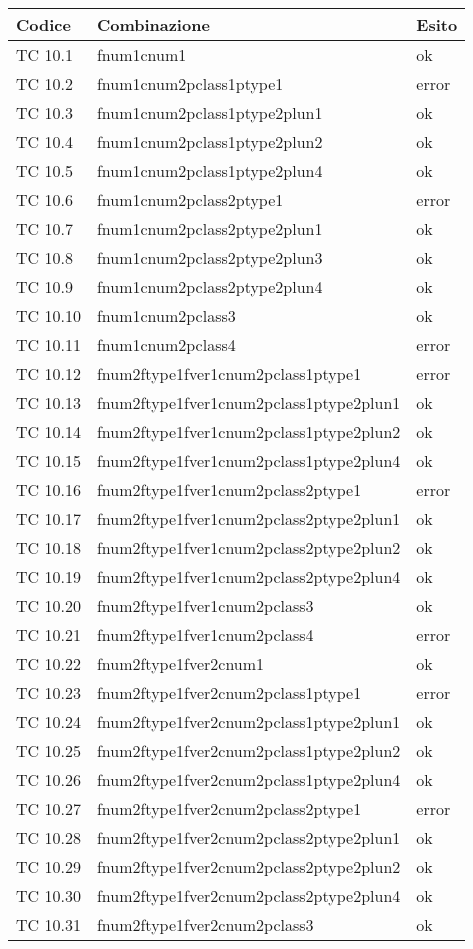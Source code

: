 \vspace{1cm}

\begin{longtable}{|p{3cm}|p{7cm}|p{3cm}|}
	\hline
	\rowcolor{Gray}
	\textbf{Codice} & \textbf{Combinazione} & \textbf{Esito}\tabularnewline
	\hline
	TC 10.1			& fnum1cnum1					& ok \tabularnewline
	\hline
	TC 10.2			& fnum1cnum2pclass1ptype1			& error \tabularnewline
	\hline
	TC 10.3			& fnum1cnum2pclass1ptype2plun1			& ok \tabularnewline
	\hline
	TC 10.4			& fnum1cnum2pclass1ptype2plun2			& ok \tabularnewline
	\hline
	TC 10.5			& fnum1cnum2pclass1ptype2plun4			& ok \tabularnewline
	\hline
	TC 10.6			& fnum1cnum2pclass2ptype1			& error \tabularnewline
	\hline
	TC 10.7			& fnum1cnum2pclass2ptype2plun1			& ok \tabularnewline
	\hline
	TC 10.8			& fnum1cnum2pclass2ptype2plun3			& ok \tabularnewline
	\hline
	TC 10.9			& fnum1cnum2pclass2ptype2plun4			& ok \tabularnewline
	\hline
	TC 10.10			& fnum1cnum2pclass3				& ok \tabularnewline
	\hline
	TC 10.11			& fnum1cnum2pclass4				& error \tabularnewline
	\hline
	TC 10.12			& fnum2ftype1fver1cnum2pclass1ptype1		& error \tabularnewline
	\hline
	TC 10.13			& fnum2ftype1fver1cnum2pclass1ptype2plun1	& ok \tabularnewline
	\hline
	TC 10.14			& fnum2ftype1fver1cnum2pclass1ptype2plun2	& ok \tabularnewline
	\hline
	TC 10.15			& fnum2ftype1fver1cnum2pclass1ptype2plun4	& ok \tabularnewline
	\hline
	TC 10.16			& fnum2ftype1fver1cnum2pclass2ptype1		& error \tabularnewline
	\hline
	TC 10.17			& fnum2ftype1fver1cnum2pclass2ptype2plun1	& ok \tabularnewline
	\hline
	TC 10.18			& fnum2ftype1fver1cnum2pclass2ptype2plun2	& ok \tabularnewline
	\hline
	TC 10.19			& fnum2ftype1fver1cnum2pclass2ptype2plun4	& ok \tabularnewline
	\hline
	TC 10.20			& fnum2ftype1fver1cnum2pclass3			& ok \tabularnewline
	\hline
	TC 10.21			& fnum2ftype1fver1cnum2pclass4			& error \tabularnewline
	\hline
	TC 10.22			& fnum2ftype1fver2cnum1				& ok \tabularnewline
	\hline
	TC 10.23			& fnum2ftype1fver2cnum2pclass1ptype1		& error \tabularnewline
	\hline
	TC 10.24			& fnum2ftype1fver2cnum2pclass1ptype2plun1	& ok \tabularnewline
	\hline
	TC 10.25			& fnum2ftype1fver2cnum2pclass1ptype2plun2	& ok \tabularnewline
	\hline
	TC 10.26			& fnum2ftype1fver2cnum2pclass1ptype2plun4	& ok \tabularnewline
	\hline
	TC 10.27			& fnum2ftype1fver2cnum2pclass2ptype1		& error \tabularnewline
	\hline
	TC 10.28			& fnum2ftype1fver2cnum2pclass2ptype2plun1	& ok \tabularnewline
	\hline
	TC 10.29			& fnum2ftype1fver2cnum2pclass2ptype2plun2	& ok \tabularnewline
	\hline
	TC 10.30			& fnum2ftype1fver2cnum2pclass2ptype2plun4	& ok \tabularnewline
	\hline
	TC 10.31			& fnum2ftype1fver2cnum2pclass3			& ok \tabularnewline

\end{longtable}
